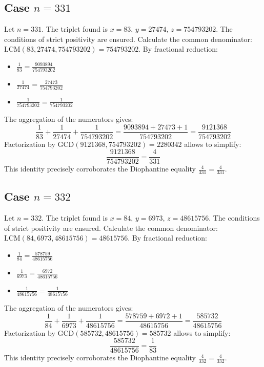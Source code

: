 \documentclass[11pt,a4paper]{article}
\begin{document}
\subsection{Case $n = 331$}
Let $n = 331$. The triplet found is $x = 83$, $y = 27474$, $z = 754793202$.
The conditions of strict positivity are ensured.
Calculate the common denominator: $\text{LCM}(83, 27474, 754793202) = 754793202$.
By fractional reduction:
\begin{itemize}
    \item $\frac{1}{83} = \frac{9093894}{754793202}$
    \item $\frac{1}{27474} = \frac{27473}{754793202}$
    \item $\frac{1}{754793202} = \frac{1}{754793202}$
\end{itemize}
The aggregation of the numerators gives:
$$ \frac{1}{83} + \frac{1}{27474} + \frac{1}{754793202} = \frac{9093894 + 27473 + 1}{754793202} = \frac{9121368}{754793202} $$
Factorization by $\text{GCD}(9121368, 754793202) = 2280342$ allows to simplify:
$$ \frac{9121368}{754793202} = \frac{4}{331} $$
This identity precisely corroborates the Diophantine equality $\frac{4}{331} = \frac{4}{331}$.

\subsection{Case $n = 332$}
Let $n = 332$. The triplet found is $x = 84$, $y = 6973$, $z = 48615756$.
The conditions of strict positivity are ensured.
Calculate the common denominator: $\text{LCM}(84, 6973, 48615756) = 48615756$.
By fractional reduction:
\begin{itemize}
    \item $\frac{1}{84} = \frac{578759}{48615756}$
    \item $\frac{1}{6973} = \frac{6972}{48615756}$
    \item $\frac{1}{48615756} = \frac{1}{48615756}$
\end{itemize}
The aggregation of the numerators gives:
$$ \frac{1}{84} + \frac{1}{6973} + \frac{1}{48615756} = \frac{578759 + 6972 + 1}{48615756} = \frac{585732}{48615756} $$
Factorization by $\text{GCD}(585732, 48615756) = 585732$ allows to simplify:
$$ \frac{585732}{48615756} = \frac{1}{83} $$
This identity precisely corroborates the Diophantine equality $\frac{4}{332} = \frac{4}{332}$.
\end{document}
